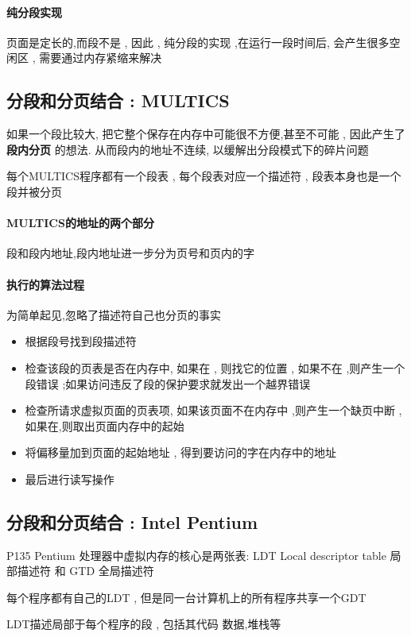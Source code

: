 \documentclass[UTF8,a4paper]{ctexart}
\begin{document}
\paragraph{纯分段实现}
页面是定长的,而段不是 , 因此 , 纯分段的实现 ,在运行一段时间后, 会产生很多空闲区 , 需要通过内存紧缩来解决

\subsection{分段和分页结合 : MULTICS}
如果一个段比较大, 把它整个保存在内存中可能很不方便,甚至不可能 , 因此产生了 \textbf{段内分页} 的想法. 从而段内的地址不连续, 以缓解出分段模式下的碎片问题

每个MULTICS程序都有一个段表 , 每个段表对应一个描述符 , 段表本身也是一个段并被分页

\paragraph{MULTICS的地址的两个部分}段和段内地址,段内地址进一步分为页号和页内的字

\paragraph{执行的算法过程}为简单起见,忽略了描述符自己也分页的事实
\begin{itemize}
	\item 根据段号找到段描述符
	\item 检查该段的页表是否在内存中, 如果在 , 则找它的位置 , 如果不在 ,则产生一个段错误 ;如果访问违反了段的保护要求就发出一个越界错误
	\item 检查所请求虚拟页面的页表项, 如果该页面不在内存中 ,则产生一个缺页中断 , 如果在,则取出页面内存中的起始
	\item 将偏移量加到页面的起始地址 , 得到要访问的字在内存中的地址
	\item 最后进行读写操作
\end{itemize}

\subsection{分段和分页结合 : Intel Pentium} P135
Pentium 处理器中虚拟内存的核心是两张表: LDT Local descriptor table 局部描述符 和 GTD 全局描述符 

每个程序都有自己的LDT , 但是同一台计算机上的所有程序共享一个GDT 

LDT描述局部于每个程序的段 , 包括其代码  数据,堆栈等 
\end{document}
